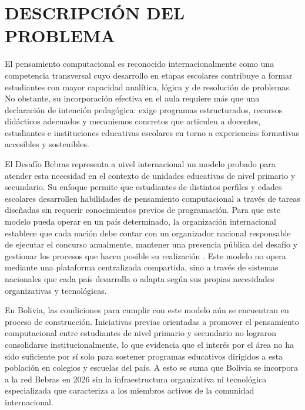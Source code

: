 \clearpage

\section{DESCRIPCIÓN DEL PROBLEMA}

El pensamiento computacional es reconocido internacionalmente como una competencia transversal cuyo desarrollo en etapas escolares contribuye a formar estudiantes con mayor capacidad analítica, lógica y de resolución de problemas. No obstante, 
su incorporación efectiva en el aula requiere más que una declaración de intención pedagógica: exige programas estructurados, recursos didácticos adecuados y mecanismos concretos que articulen a docentes, estudiantes e instituciones educativas escolares en torno a experiencias formativas accesibles y sostenibles.

El Desafío Bebras representa a nivel internacional un modelo probado para atender esta necesidad en el contexto de unidades educativas de nivel primario y secundario. Su enfoque permite que estudiantes de distintos perfiles y edades escolares desarrollen habilidades de pensamiento computacional a través de tareas diseñadas 
sin requerir conocimientos previos de programación. Para que este modelo pueda operar en un país determinado, la organización internacional establece que cada nación debe contar con un organizador nacional responsable de ejecutar el concurso anualmente, mantener una presencia pública del desafío y gestionar los procesos que hacen posible su realización \cite{bebras}. Este modelo no opera mediante una plataforma centralizada compartida, sino a través de sistemas nacionales que cada país desarrolla o adapta según sus propias necesidades organizativas y tecnológicas.

En Bolivia, las condiciones para cumplir con este modelo aún se encuentran en proceso de construcción. Iniciativas previas orientadas a promover el pensamiento computacional entre estudiantes de nivel primario y secundario no lograron consolidarse institucionalmente,
lo que evidencia que el interés por el área no ha sido suficiente por sí solo para sostener programas educativos dirigidos a esta población en colegios y escuelas del país. A esto se suma que Bolivia se incorpora a la red Bebras en 2026 sin la infraestructura organizativa ni tecnológica especializada que caracteriza a los miembros activos de la comunidad internacional.

